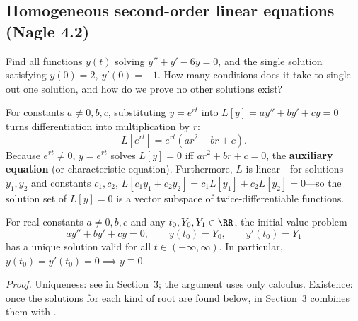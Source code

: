\documentclass[10pt]{scrartcl}
\begin{document}
\subsection{Homogeneous second-order linear equations (Nagle 4.2)}
\begin{qbox}
  Find all functions $y(t)$ solving $y''+y'-6y=0$, and the single solution satisfying $y(0)=2,\ y'(0)=-1$. How many conditions does it take to single out one solution, and how do we prove no other solutions exist?
\end{qbox}

For constants $a\neq 0, b, c$, substituting $y=e^{rt}$ into $L[y]=ay''+by'+cy=0$ turns differentiation into multiplication by $r$:
\[
  L[e^{rt}] = e^{rt}(ar^2+br+c).
\]
Because $e^{rt}\neq 0$, $y=e^{rt}$ solves $L[y]=0$ iff $ar^2+br+c=0$, the \textbf{auxiliary equation} (or characteristic equation). Furthermore, $L$ is linear---for solutions $y_1,y_2$ and constants $c_1,c_2$, $L[c_1y_1+c_2y_2]=c_1L[y_1]+c_2L[y_2]=0$---so the solution set of $L[y]=0$ is a vector subspace of twice-differentiable functions.

\begin{theorem*}
  For real constants $a\neq 0,b,c$ and any $t_0,Y_0,Y_1\in\RR$, the initial value problem
  \[
    ay''+by'+cy=0,\qquad y(t_0)=Y_0,\qquad y'(t_0)=Y_1
  \]
  has a unique solution valid for all $t\in(-\infty,\infty)$. In particular, $y(t_0)=y'(t_0)=0 \implies y\equiv 0$.
\end{theorem*}
\noindent\emph{Proof.} Uniqueness: see  in Section~3; the argument uses only calculus. Existence: once the solutions for each kind of root are found below,  in Section~3 combines them with .
\end{document}

